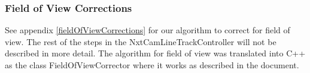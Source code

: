 

\subsubsection{Field of View Corrections}
See appendix \ref{fieldOfViewCorrections} for our algorithm to correct for field of view. The rest of the steps in the NxtCamLineTrackController will not be described in more detail. The algorithm for field of view was translated into C++ as the class FieldOfViewCorrector where it works as described in the document. 
